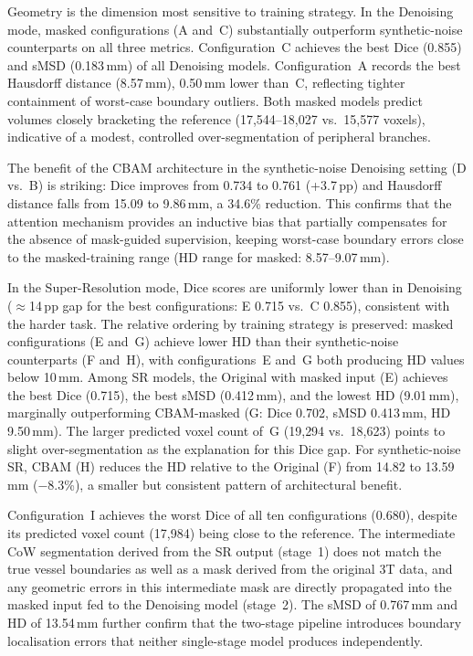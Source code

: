 \documentclass[11pt]{article}
\begin{document}
Geometry is the dimension most sensitive to training strategy.  In the Denoising mode, masked
configurations (A and~C) substantially outperform synthetic-noise counterparts on all three
metrics.  Configuration~C achieves the best Dice (0.855) and sMSD (0.183\,mm) of all Denoising
models.  Configuration~A records the best Hausdorff distance (8.57\,mm), 0.50\,mm lower than~C,
reflecting tighter containment of worst-case boundary outliers.  Both masked models predict
volumes closely bracketing the reference (17{,}544--18{,}027 vs.\ 15{,}577 voxels), indicative
of a modest, controlled over-segmentation of peripheral branches.

The benefit of the CBAM architecture in the synthetic-noise Denoising setting (D vs.\ B) is
striking: Dice improves from 0.734 to 0.761 (+3.7\,pp) and Hausdorff distance falls from
15.09 to 9.86\,mm, a 34.6\% reduction.  This confirms that the attention mechanism provides an
inductive bias that partially compensates for the absence of mask-guided supervision, keeping
worst-case boundary errors close to the masked-training range (HD range for masked:
8.57--9.07\,mm).

In the Super-Resolution mode, Dice scores are uniformly lower than in Denoising ($\approx$14\,pp
gap for the best configurations: E 0.715 vs.\ C 0.855), consistent with the harder task.  The
relative ordering by training strategy is preserved: masked configurations (E and~G) achieve
lower HD than their synthetic-noise counterparts (F and~H), with configurations~E and~G both
producing HD values below 10\,mm.  Among SR models, the Original with masked input (E) achieves
the best Dice (0.715), the best sMSD (0.412\,mm), and the lowest HD (9.01\,mm), marginally
outperforming CBAM-masked (G: Dice 0.702, sMSD 0.413\,mm, HD 9.50\,mm).  The larger predicted
voxel count of~G (19{,}294 vs.\ 18{,}623) points to slight over-segmentation as the explanation
for this Dice gap.  For synthetic-noise SR, CBAM (H) reduces the HD relative to the Original (F)
from 14.82 to 13.59\,mm ($-$8.3\%), a smaller but consistent pattern of architectural benefit.

Configuration~I achieves the worst Dice of all ten configurations (0.680), despite its
predicted voxel count (17{,}984) being close to the reference.  The intermediate CoW
segmentation derived from the SR output (stage~1) does not match the true vessel boundaries as
well as a mask derived from the original 3T data, and any geometric errors in this intermediate
mask are directly propagated into the masked input fed to the Denoising model (stage~2).  The
sMSD of 0.767\,mm and HD of 13.54\,mm further confirm that the two-stage pipeline introduces
boundary localisation errors that neither single-stage model produces independently.
\end{document}
